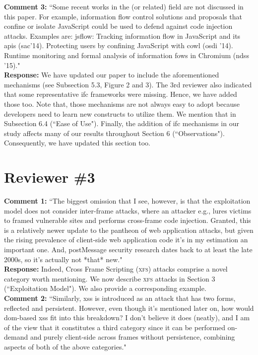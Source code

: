\documentclass[10pt,journal,compsoc]{IEEEtran}
\begin{document}
\noindent
{\bf Comment 3:} ``Some recent works in the (or related) 
field are not discussed in this paper.
For example, information flow control solutions and
proposals that confine or isolate JavaScript could
be used to defend against code injection attacks.
Examples are: {\sc jsf}low: Tracking information
flow in JavaScript and its {\sc api}s ({\sc sac}'14).
Protecting users by confining JavaScript with {\sc cowl} ({\sc osdi} '14).
Runtime monitoring and formal analysis of information
fows in Chromium ({\sc ndss} '15)."\\

\noindent
{\bf Response:}
We have updated our paper to include the
aforementioned mechanisms
(see Subsection 5.3, Figure 2 and 3).
The 3rd reviewer also
indicated that some representative
{\sc ifc} frameworks were missing.
Hence, we have added those too.
Note that,
those mechanisms are not
always easy to adopt because
developers need to learn new constructs
to utilize them.
We mention that in Subsection 6.4
(``Ease of Use").
Finally,
the addition of {\sc ifc} mechanisms
in our study affects many of our results
throughout Section 6 (``Observations").
Consequently,
we have updated this section too.\\

\section{Reviewer \#3}
\label{sec:r3}

{\bf Comment 1:} ``The biggest omission that I see,
however,
is that the exploitation model does not consider
inter-frame attacks, where an attacker
e.g., lures victims to framed vulnerable
sites and performs cross-frame code
injection.  Granted, this is a relatively
newer update to the pantheon of
web application attacks, but given the rising
prevalence of client-side
web application code it's in my
estimation an important one. 
And,
postMessage
security research dates back to at least the late 2000s,
so it's actually not *that* new."\\

\noindent
{\bf Response:}
Indeed,
Cross Frame Scripting (\textsc{xfs}) attacks
comprise a novel category worth mentioning.
We now describe \textsc{xfs} attacks
in Section 3 (``Exploitation Model").
We also provide a corresponding example.\\

\noindent
{\bf Comment 2:} ``Similarly, {\sc xss} is introduced
as an attack that has two forms,
reflected and persistent.
However,
even though it's mentioned later on,
how would {\sc dom}-based {\sc xss} fit into this breakdown?
I don't believe it does (neatly),
and I am of the view that it constitutes a third
category since it can be performed on-demand
and purely client-side across frames without persistence,
combining aspects of both of the above categories."\\
\end{document}
